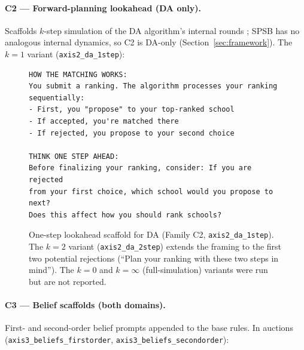 \paragraph{C2 --- Forward-planning lookahead (DA only).} Scaffolds $k$-step simulation of the DA algorithm's internal rounds \citep{pycia2023theory}; SPSB has no analogous internal dynamics, so C2 is DA-only (Section~\ref{sec:framework}). The $k{=}1$ variant (\texttt{axis2\_da\_1step}):

\begin{figure}[H]
\begin{lstlisting}
HOW THE MATCHING WORKS:
You submit a ranking. The algorithm processes your ranking
sequentially:
- First, you "propose" to your top-ranked school
- If accepted, you're matched there
- If rejected, you propose to your second choice

THINK ONE STEP AHEAD:
Before finalizing your ranking, consider: If you are rejected
from your first choice, which school would you propose to next?
Does this affect how you should rank schools?
\end{lstlisting}
\caption{One-step lookahead scaffold for DA (Family C2, \texttt{axis2\_da\_1step}). The $k{=}2$ variant (\texttt{axis2\_da\_2step}) extends the framing to the first two potential rejections (``Plan your ranking with these two steps in mind''). The $k{=}0$ and $k{=}\infty$ (full-simulation) variants were run but are not reported.}
\label{fig:prompt-lookahead}
\end{figure}

\paragraph{C3 --- Belief scaffolds (both domains).} First- and second-order belief prompts appended to the base rules. In auctions (\texttt{axis3\_beliefs\_firstorder}, \texttt{axis3\_beliefs\_secondorder}):

